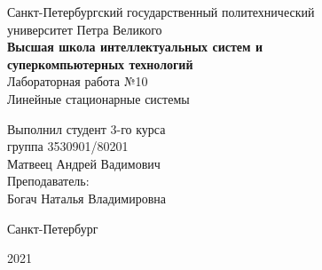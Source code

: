\documentclass[a4paper]{article}
\begin{document}
    \begin{center}
        \begin{center}
        \hfill \break
        \normalsize{Санкт-Петербургский государственный политехнический}\\
        \normalsize{университет Петра Великого}\\
        \hfill \break
        \normalsize{\textbf{Высшая школа интеллектуальных систем и}}\\ 
        \normalsize{\textbf{суперкомпьютерных технологий}}\\ 
        \hfill \break
        \hfill \break
        \hfill \break
        \normalsize{Лабораторная работа №10}\\
        \hfill \break
        \hfill \break
        \normalsize{\LARGE Линейные стационарные системы}\\
        \end{center}
        \hfill \break
        \hfill \break
        \hfill \break
        \hfill \break
        \hfill \break
        \hfill \break
        \hfill \break
        \hfill \break
        \hfill \break
        \hfill \break
        \begin{flushright}
            \normalsize{Выполнил студент 3-го курса}\\
            \normalsize{группа 3530901/80201}\\
            \normalsize{Матвеец Андрей Вадимович}\\
            \hfill \break
            \normalsize{Преподаватель:}\\
            \normalsize{Богач Наталья Владимировна}\\
        \end{flushright}
        \hfill \break
        \hfill \break
        \hfill \break
        \hfill \break
        \begin{center} Санкт-Петербург\end{center}
        \begin{center}2021\end{center} 
        \thispagestyle{empty}
    \end{center}
    
    \newpage
        \tableofcontents
    
    \newpage
         \listoffigures
    
    \newpage
         \lstlistoflistings   
     
\end{document}
